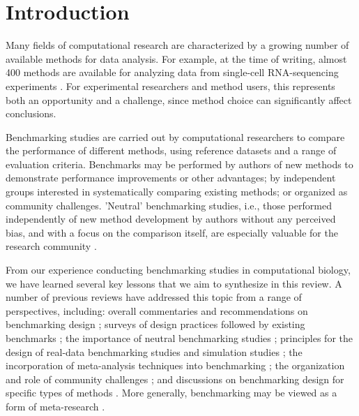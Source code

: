 \section{Introduction}

Many fields of computational research are characterized by a growing number of available methods for data analysis. For example, at the time of writing, almost 400 methods are available for analyzing data from single-cell RNA-sequencing experiments \cite{zappia_exploringsinglecellrnaseq_2018}. For experimental researchers and method users, this represents both an opportunity and a challenge, since method choice can significantly affect conclusions.

Benchmarking studies are carried out by computational researchers to compare the performance of different methods, using reference datasets and a range of evaluation criteria. Benchmarks may be performed by authors of new methods to demonstrate performance improvements or other advantages; by independent groups interested in systematically comparing existing methods; or organized as community challenges. 'Neutral' benchmarking studies, i.e., those performed independently of new method development by authors without any perceived bias, and with a focus on the comparison itself, are especially valuable for the research community \cite{boulesteix_necessitydesignstudies_2018,boulesteix_pleaneutralcomparison_2013}.

From our experience conducting benchmarking studies in computational biology, we have learned several key lessons that we aim to synthesize in this review. A number of previous reviews have addressed this topic from a range of perspectives, including: overall commentaries and recommendations on benchmarking design \cite{boulesteix_necessitydesignstudies_2018,peters_puttingbenchmarkstheir_2018,boulesteix_tensimplerules_2015,zheng_benchmarkingcontextsdetails_2017,mangul_systematicbenchmarkingomics_2019,norel_selfassessmenttrapcan_2011,aniba_issuesbioinformaticsbenchmarking_2010}; surveys of design practices followed by existing benchmarks \cite{mangul_systematicbenchmarkingomics_2019}; the importance of neutral benchmarking studies \cite{boulesteix_pleaneutralcomparison_2013}; principles for the design of real-data benchmarking studies \cite{boulesteix_evidencebasedcomputationalstatistics_2017,boulesteix_statisticalframeworkhypothesis_2015} and simulation studies \cite{morris_usingsimulationstudies_2019}; the incorporation of meta-analysis techniques into benchmarking \cite{gardner_identifyingaccuratemetagenome_2019,gardner_metaanalysisbioinformaticssoftware_2017,evangelou_metaanalysismethodsgenomewide_2013,hong_comparisonmetaanalysismethods_2008}; the organization and role of community challenges \cite{boutros_betterbenchmarkingchallengebased_2014,friedberg_tensimplerules_2015}; and discussions on benchmarking design for specific types of methods \cite{vanmechelen_benchmarkingclusteranalysis_2018,angers-loustau_challengesdesigningbenchmark_2018}. More generally, benchmarking may be viewed as a form of meta-research \cite{ioannidis_metaresearchwhyresearch_2018}.

